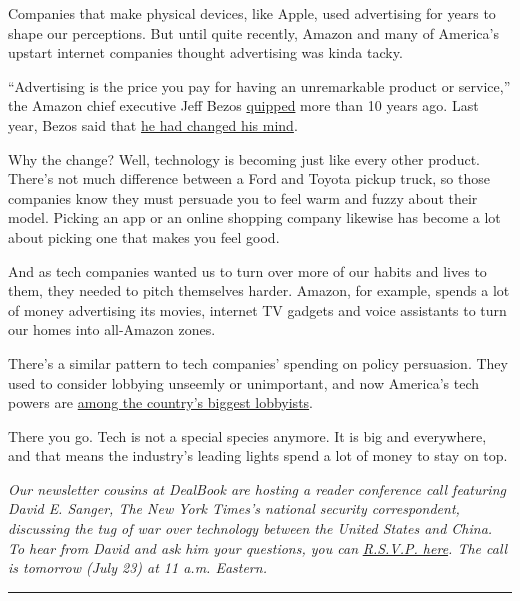Companies that make physical devices, like Apple, used advertising for
years to shape our perceptions. But until quite recently, Amazon and
many of America's upstart internet companies thought advertising was
kinda tacky.

``Advertising is the price you pay for having an unremarkable product or
service,'' the Amazon chief executive Jeff Bezos
\href{https://blog.seattlepi.com/amazon/2009/05/28/amazons-jeff-bezos-on-kindle-advertising-and-being-green/}{quipped}
more than 10 years ago. Last year, Bezos said that
\href{https://www.cnbc.com/2019/02/02/jeff-bezos-says-hes-had-a-change-of-heart-on-advertising--now-amazon-is-the-fifth-biggest-ad-spender-in-the-us-.html}{he
had changed his mind}.

Why the change? Well, technology is becoming just like every other
product. There's not much difference between a Ford and Toyota pickup
truck, so those companies know they must persuade you to feel warm and
fuzzy about their model. Picking an app or an online shopping company
likewise has become a lot about picking one that makes you feel good.

And as tech companies wanted us to turn over more of our habits and
lives to them, they needed to pitch themselves harder. Amazon, for
example, spends a lot of money advertising its movies, internet TV
gadgets and voice assistants to turn our homes into all-Amazon zones.

There's a similar pattern to tech companies' spending on policy
persuasion. They used to consider lobbying unseemly or unimportant, and
now America's tech powers are
\href{https://www.washingtonpost.com/technology/2020/01/22/amazon-facebook-google-lobbying-2019/}{among
the country's biggest lobbyists}.

There you go. Tech is not a special species anymore. It is big and
everywhere, and that means the industry's leading lights spend a lot of
money to stay on top.

\emph{Our newsletter cousins at DealBook are hosting a reader conference
call featuring David E. Sanger, The New York Times's national security
correspondent, discussing the tug of war over technology between the
United States and China. To hear from David and ask him your questions,
you can}
\href{https://timesevents.nytimes3xbfgragh.onion/dealbook0723}{\emph{R.S.V.P.
here}}\emph{. The call is tomorrow (July 23) at 11 a.m. Eastern.}

\begin{center}\rule{0.5\linewidth}{\linethickness}\end{center}

